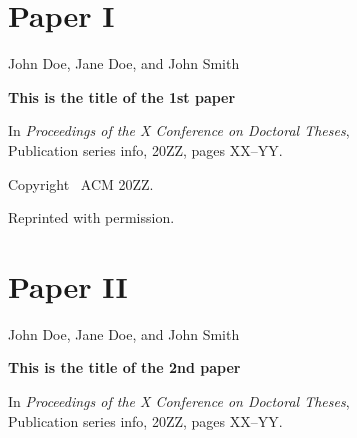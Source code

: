 \documentclass[officiallayout]{tktla}
\begin{document}
\chapter*{Paper I}\thispagestyle{empty}



\vspace{80pt}
\noindent John Doe, Jane Doe, and John Smith

\vspace{10pt}
\noindent\textbf{This is the title of the 1st paper}

\vspace{10pt}
\noindent In
\emph{Proceedings of the X Conference on Doctoral Theses}, 
\\Publication series info, 20ZZ, pages XX--YY.

\vspace{60pt}
\noindent Copyright \textcopyright\ ACM 20ZZ.

\noindent Reprinted with permission.

\cleardoublepage
%




\chapter*{Paper II}\thispagestyle{empty}


\vspace{80pt}

\noindent John Doe, Jane Doe, and John Smith

\vspace{10pt}
\noindent\textbf{This is the title of the 2nd paper}

\vspace{10pt}
\noindent In 
\emph{Proceedings of the X Conference on Doctoral Theses}, 
\\Publication series info, 20ZZ, pages XX--YY.
\end{document}

